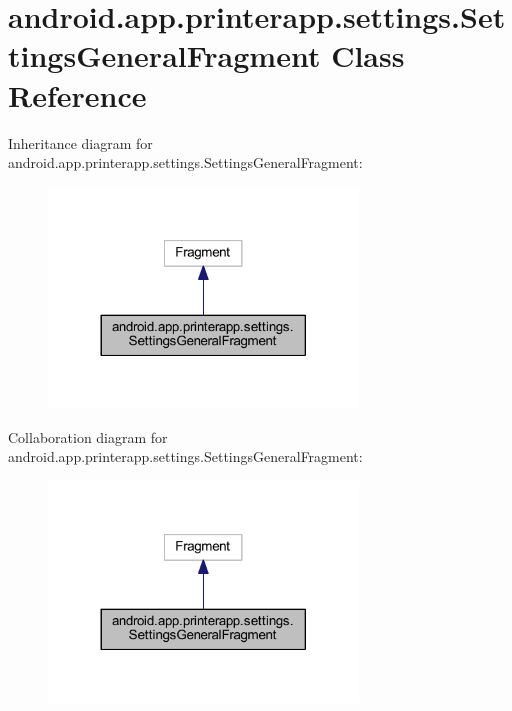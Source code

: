 \hypertarget{classandroid_1_1app_1_1printerapp_1_1settings_1_1_settings_general_fragment}{}\section{android.\+app.\+printerapp.\+settings.\+Settings\+General\+Fragment Class Reference}
\label{classandroid_1_1app_1_1printerapp_1_1settings_1_1_settings_general_fragment}


Inheritance diagram for android.\+app.\+printerapp.\+settings.\+Settings\+General\+Fragment\+:
\nopagebreak
\begin{figure}[H]
\begin{center}
\leavevmode
\includegraphics[width=233pt]{classandroid_1_1app_1_1printerapp_1_1settings_1_1_settings_general_fragment__inherit__graph}
\end{center}
\end{figure}


Collaboration diagram for android.\+app.\+printerapp.\+settings.\+Settings\+General\+Fragment\+:
\nopagebreak
\begin{figure}[H]
\begin{center}
\leavevmode
\includegraphics[width=233pt]{classandroid_1_1app_1_1printerapp_1_1settings_1_1_settings_general_fragment__coll__graph}
\end{center}
\end{figure}
